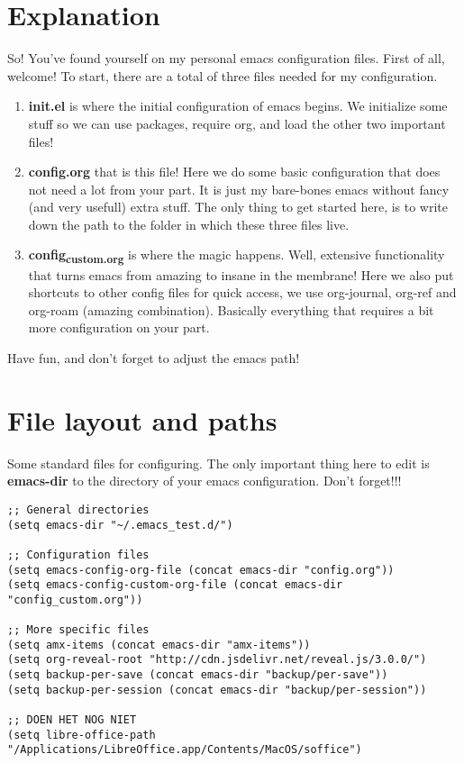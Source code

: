 \documentclass[11pt]{article}
\begin{document}
\section{Explanation}
\label{sec:org0795747}
So! You've found yourself on my personal emacs configuration files. First of all, welcome! To start, there are a total of three files needed for my configuration.

\begin{enumerate}
\item \textbf{init.el} is where the initial configuration of emacs begins. We initialize some stuff so we can use packages, require org, and load the other two important files!
\item \textbf{config.org} that is this file! Here we do some basic configuration that does not need a lot from your part. It is just my bare-bones emacs without fancy (and very usefull) extra stuff. The only thing to get started here, is to write down the path to the folder in which these three files live.
\item \textbf{config\textsubscript{custom.org}} is where the magic happens. Well, extensive functionality that turns emacs from amazing to insane in the membrane! Here we also put shortcuts to other config files for quick access, we use org-journal, org-ref and org-roam (amazing combination). Basically everything that requires a bit more configuration on your part.
\end{enumerate}

Have fun, and don't forget to adjust the emacs path!

\section{File layout and paths}
\label{sec:orgc59bde4}
Some standard files for configuring. The only important thing here to edit is \textbf{emacs-dir} to the directory of your emacs configuration. Don't forget!!!
\begin{verbatim}
;; General directories
(setq emacs-dir "~/.emacs_test.d/")

;; Configuration files
(setq emacs-config-org-file (concat emacs-dir "config.org"))
(setq emacs-config-custom-org-file (concat emacs-dir "config_custom.org"))

;; More specific files
(setq amx-items (concat emacs-dir "amx-items"))
(setq org-reveal-root "http://cdn.jsdelivr.net/reveal.js/3.0.0/")
(setq backup-per-save (concat emacs-dir "backup/per-save"))
(setq backup-per-session (concat emacs-dir "backup/per-session"))

;; DOEN HET NOG NIET
(setq libre-office-path "/Applications/LibreOffice.app/Contents/MacOS/soffice")
\end{verbatim}
\end{document}
